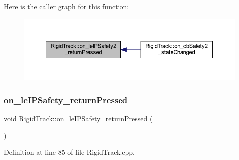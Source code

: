 Here is the caller graph for this function\+:\nopagebreak
\begin{figure}[H]
\begin{center}
\leavevmode
\includegraphics[width=350pt]{class_rigid_track_a555c536593d659b940de43cd2db8d6c1_icgraph}
\end{center}
\end{figure}
\mbox{\label{class_rigid_track_aa527ab3a2ddc7b31bf1063260efc9755}} 
\subsubsection{\texorpdfstring{on\+\_\+le\+I\+P\+Safety\+\_\+return\+Pressed}{on\_leIPSafety\_returnPressed}}
{\footnotesize\ttfamily void Rigid\+Track\+::on\+\_\+le\+I\+P\+Safety\+\_\+return\+Pressed (\begin{DoxyParamCaption}{ }\end{DoxyParamCaption})\hspace{0.3cm}{\ttfamily [slot]}}



Definition at line 85 of file Rigid\+Track.\+cpp.


